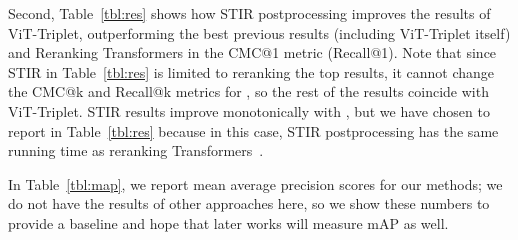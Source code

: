 \documentclass{article}
\begin{document}
Second, Table~\ref{tbl:res} shows how STIR postprocessing improves the results of ViT-Triplet, outperforming the best previous results (including ViT-Triplet itself) and Reranking Transformers in the CMC@1 metric (Recall@1). Note that since STIR in Table~\ref{tbl:res} is limited to reranking the top  results, it cannot change the CMC@k and Recall@k 
metrics for , so the rest of the results coincide with ViT-Triplet. STIR results improve monotonically with , but we have chosen  to report in Table~\ref{tbl:res} because in this case, STIR postprocessing has the same running time as reranking Transformers~\cite{DBLP:conf/iccv/TanYO21}.


In Table~\ref{tbl:map}, we report mean average precision scores for our methods; we do not have the results of other approaches here, so we show these numbers to provide a baseline and hope that later works will measure mAP as well.
\end{document}
